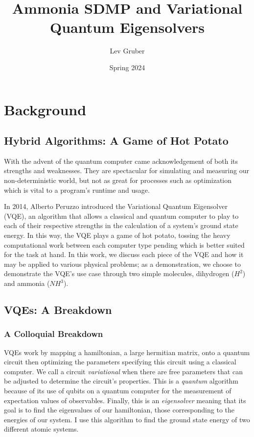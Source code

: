 \documentclass[10pt,twocolumn,letterpaper]{article}
\title{Ammonia SDMP and Variational Quantum Eigensolvers}
\author{Lev Gruber}
\date{Spring 2024}
\begin{document}
\maketitle

\section{Background}

\subsection{Hybrid Algorithms: A Game of Hot Potato}
With the advent of the quantum computer came acknowledgement of both its strengths and weaknesses. They are spectacular for simulating and measuring our non-deterministic world, but not as great for processes such as optimization which is vital to a program's runtime and usage. 

In 2014, Alberto Peruzzo introduced the Variational Quantum Eigensolver (VQE), an algorithm that allows a classical and quantum computer to play to each of their respective strengths in the calculation of a system's ground state energy. In this way, the VQE plays a game of hot potato, tossing the heavy computational work between each computer type pending which is better suited for the task at hand. In this work, we discuss each piece of the VQE and how it may be applied to various physical problems; as a demonstration, we choose to demonstrate the VQE's use case through two simple molecules, dihydrogen ($H^2$) and ammonia ($NH^3$).  
\subsection{VQEs: A Breakdown}
\subsubsection{A Colloquial Breakdown}
VQEs work by mapping a hamiltonian, a large hermitian matrix, onto a quantum circuit then optimizing the parameters specifying this circuit using a classical computer. We call a circuit \textit{variational} when there are free parameters that can be adjusted to determine the circuit's properties. This is a \textit{quantum} algorithm because of its use of qubits on a quantum computer for the measurement of expectation values of observables. Finally, this is an \textit{eigensolver} meaning that its goal is to find the eigenvalues of our hamiltonian, those corresponding to the energies of our system. I use this algorithm to find the ground state energy of two different atomic systems.
\end{document}
